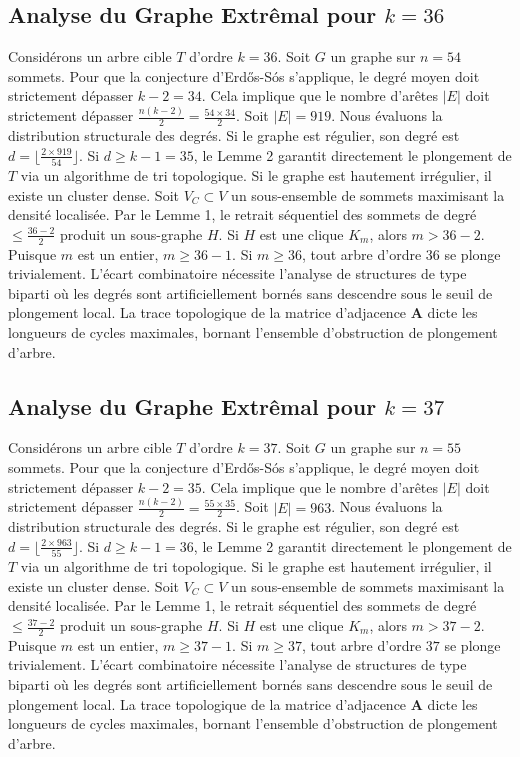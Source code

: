 \documentclass[11pt,a4paper]{article}
\begin{document}
\subsection{Analyse du Graphe Extr\^emal pour $k=36$}
Consid\'erons un arbre cible $T$ d'ordre $k=36$.
Soit $G$ un graphe sur $n=54$ sommets.
Pour que la conjecture d'Erd\H{o}s-S\'os s'applique, le degr\'e moyen doit strictement d\'epasser $k-2 = 34$.
Cela implique que le nombre d'ar\^etes $|E|$ doit strictement d\'epasser $\frac{n(k-2)}{2} = \frac{54 \times 34}{2}$.
Soit $|E| = 919$.
Nous \'evaluons la distribution structurale des degr\'es. Si le graphe est r\'egulier, son degr\'e est $d = \lfloor \frac{2 \times 919}{54} \rfloor$.
Si $d \geq k-1 = 35$, le Lemme 2 garantit directement le plongement de $T$ via un algorithme de tri topologique.
Si le graphe est hautement irr\'egulier, il existe un cluster dense. Soit $V_C \subset V$ un sous-ensemble de sommets maximisant la densit\'e localis\'ee.
Par le Lemme 1, le retrait s\'equentiel des sommets de degr\'e $\leq \frac{36-2}{2}$ produit un sous-graphe $H$.
Si $H$ est une clique $K_{m}$, alors $m > 36-2$. Puisque $m$ est un entier, $m \geq 36-1$. Si $m \geq 36$, tout arbre d'ordre $36$ se plonge trivialement.
L'\'ecart combinatoire n\'ecessite l'analyse de structures de type biparti o\`u les degr\'es sont artificiellement born\'es sans descendre sous le seuil de plongement local. La trace topologique de la matrice d'adjacence $\mathbf{A}$ dicte les longueurs de cycles maximales, bornant l'ensemble d'obstruction de plongement d'arbre.


\subsection{Analyse du Graphe Extr\^emal pour $k=37$}
Consid\'erons un arbre cible $T$ d'ordre $k=37$.
Soit $G$ un graphe sur $n=55$ sommets.
Pour que la conjecture d'Erd\H{o}s-S\'os s'applique, le degr\'e moyen doit strictement d\'epasser $k-2 = 35$.
Cela implique que le nombre d'ar\^etes $|E|$ doit strictement d\'epasser $\frac{n(k-2)}{2} = \frac{55 \times 35}{2}$.
Soit $|E| = 963$.
Nous \'evaluons la distribution structurale des degr\'es. Si le graphe est r\'egulier, son degr\'e est $d = \lfloor \frac{2 \times 963}{55} \rfloor$.
Si $d \geq k-1 = 36$, le Lemme 2 garantit directement le plongement de $T$ via un algorithme de tri topologique.
Si le graphe est hautement irr\'egulier, il existe un cluster dense. Soit $V_C \subset V$ un sous-ensemble de sommets maximisant la densit\'e localis\'ee.
Par le Lemme 1, le retrait s\'equentiel des sommets de degr\'e $\leq \frac{37-2}{2}$ produit un sous-graphe $H$.
Si $H$ est une clique $K_{m}$, alors $m > 37-2$. Puisque $m$ est un entier, $m \geq 37-1$. Si $m \geq 37$, tout arbre d'ordre $37$ se plonge trivialement.
L'\'ecart combinatoire n\'ecessite l'analyse de structures de type biparti o\`u les degr\'es sont artificiellement born\'es sans descendre sous le seuil de plongement local. La trace topologique de la matrice d'adjacence $\mathbf{A}$ dicte les longueurs de cycles maximales, bornant l'ensemble d'obstruction de plongement d'arbre.
\end{document}
